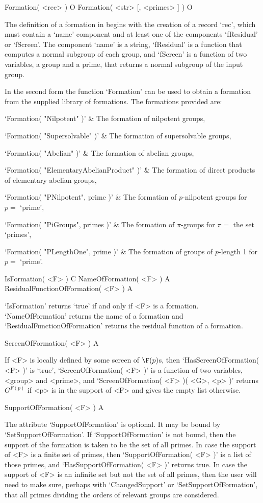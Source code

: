 \> Formation( <rec> ) O
\> Formation( <str> [, <primes> ] ) O

The definition of a formation in {\FORMAT} begins with the creation of a
record `rec', which must contain a `name' component and at least one of
the components `fResidual' or `fScreen'. The component `name' is a string, 
`fResidual' is a function that computes a normal subgroup of each group,
and `fScreen' is a function of two variables, a group and a prime, that
returns a normal subgroup of the input group.

In the second form the function `Formation' can be used to obtain a
formation from the supplied library of formations. The formations
provided are:

\beginitems
`Formation( "Nilpotent" )' & The formation of nilpotent groups,  

`Formation( "Supersolvable" )' & The formation of supersolvable groups,
 

`Formation( "Abelian" )' & The formation of abelian groups,
 

`Formation( "ElementaryAbelianProduct" )' & The formation of direct products of elementary abelian groups,
 

`Formation( "PNilpotent", prime )' & The formation of $p$-nilpotent groups 
for $p =$ `prime',


`Formation( "PiGroups", primes )' & The formation of $\pi$-groups for 
$\pi =$ the set `primes',


`Formation( "PLengthOne", prime )' & The formation of groups of $p$-length 1 
for $p =$ `prime'.
\enditems

\> IsFormation( <F> ) C
\> NameOfFormation( <F> ) A
\> ResidualFunctionOfFormation( <F> ) A

`IsFormation' returns `true' if and only if <F> is a {\GAP} formation. 
`NameOfFormation' returns the name of a formation and `ResidualFunctionOfFormation'
returns the  residual function of a formation. 

\> ScreenOfFormation( <F> ) A

If <F> is locally defined by some screen of $\F(p)$s, 
then `HasScreenOfFormation( <F> )' is `true', `ScreenOfFormation( <F> )' is a function of two variables, <group> and <prime>, and 
`ScreenOfFormation( <F> )(  <G>, <p> )' returns $G^{F(p)}$ if <p> is
in the support of <F> and  gives the empty list otherwise. 

\> SupportOfFormation( <F> ) A

The attribute `SupportOfFormation' is optional. It may be bound by
`SetSupportOfFormation'. If `SupportOfFormation' is not bound, then the support
of the formation is taken to be the set of all primes. In case the support of
<F> is a finite set of primes, then `SupportOfFormation( <F> )' is a list of
those primes, and `HasSupportOfFormation( <F> )' returns true. In case the
support of <F> is an infinite set but not the set of all primes, then the user
will need to make sure, perhaps with `ChangedSupport' or
`SetSupportOfFormation', that all primes dividing the orders of relevant groups
are considered.

